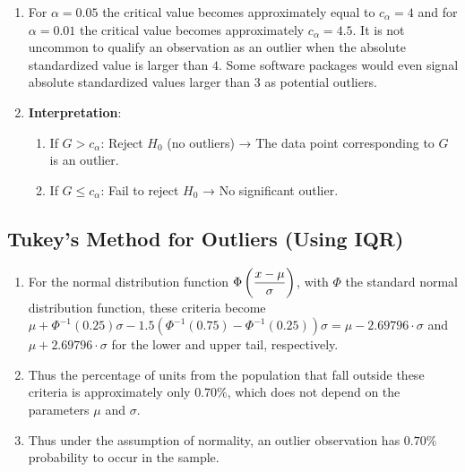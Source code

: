 \begin{enumerate}
    \item  For $\alpha = 0.05$ the critical value becomes approximately equal to $c_\alpha = 4$ and for $\alpha = 0.01$ the critical value becomes approximately $c_\alpha = 4.5$. 
    It is not uncommon to qualify an observation as an outlier when the absolute standardized value is larger than $4$. 
    Some software packages would even signal absolute standardized values larger than $3$ as potential outliers.
    \hfill \cite{statistics/book/Statistics-for-Data-Scientists/Maurits-Kaptein}

    \item \textbf{Interpretation}:
    \hfill \cite{common/online/chatgpt}
    \begin{enumerate}
        \item If $G>c_\alpha$: Reject $H_0$ (no outliers) → The data point corresponding to $G$ is an outlier.
        \hfill \cite{common/online/chatgpt}

        \item If $G\leq c_\alpha$: Fail to reject $H_0$ → No significant outlier.
        \hfill \cite{common/online/chatgpt}
    \end{enumerate}

\end{enumerate}






\subsection{Tukey’s Method for Outliers (Using IQR)}

\begin{enumerate}
    \item For the normal distribution function $\Phi\left(\dfrac{x - \mu}{\sigma}\right)$, with $\Phi$ the standard normal distribution function, these criteria become $\mu + \Phi^{-1}(0.25)\sigma - 1.5(\Phi^{-1}(0.75) - \Phi^{-1}(0.25))\sigma = \mu - 2.69796\cdot\sigma$ and $\mu + 2.69796\cdot\sigma$ for the lower and upper tail, respectively. 
    \hfill \cite{statistics/book/Statistics-for-Data-Scientists/Maurits-Kaptein}

    \item Thus the percentage of units from the population that fall outside these criteria is approximately only $0.70\%$, which does not depend on the parameters $\mu$ and $\sigma$. 
    \hfill \cite{statistics/book/Statistics-for-Data-Scientists/Maurits-Kaptein}
    
    \item Thus under the assumption of normality, an outlier observation has $0.70\%$ probability to occur in the sample.
    \hfill \cite{statistics/book/Statistics-for-Data-Scientists/Maurits-Kaptein}
\end{enumerate}





